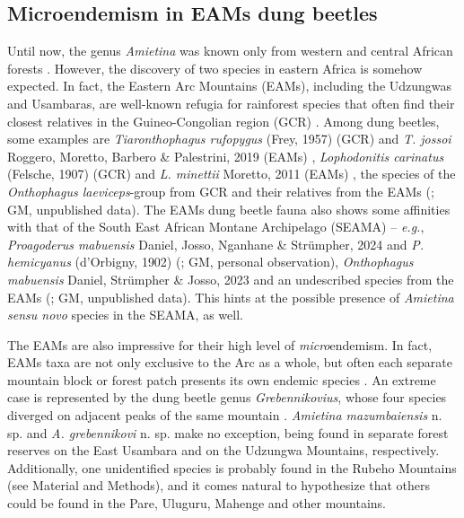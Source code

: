 \documentclass[fleqn,10pt,lineno]{wlpeerj}
\begin{document}
\subsection*{Microendemism in EAMs dung beetles} 
Until now, the genus \textit{Amietina} was known only from western and central African forests \citep{davis2008african}. However, the discovery of two species in eastern Africa is somehow expected. In fact, the Eastern Arc Mountains (EAMs), including the Udzungwas and Usambaras, are well-known refugia for rainforest species that often find their closest relatives in the Guineo-Congolian region (GCR) \citep{lovett2008biogeography, grebennikov2019miocene, grebennikov2021sky}. Among dung beetles, some examples are \textit{Tiaronthophagus rufopygus} (Frey, 1957) (GCR) and \textit{T. jossoi} Roggero, Moretto, Barbero \& Palestrini, 2019 (EAMs) \citep{roggero2019phylogenetic}, \textit{Lophodonitis carinatus} (Felsche, 1907) (GCR) and \textit{L. minettii} Moretto, 2011 (EAMs) \citep{moretto2011nouveaux}, the species of the \textit{Onthophagus laeviceps}-group from GCR and their relatives from the EAMs (\citealt{moretto2020nouveaux}; GM, unpublished data). The EAMs dung beetle fauna also shows some affinities with that of the South East African Montane Archipelago (SEAMA) \citep{bayliss2024biogeographical} -- \textit{e.g.}, \textit{Proagoderus mabuensis} Daniel, Josso, Nganhane \& Strümpher, 2024 and \textit{P. hemicyanus} (d'Orbigny, 1902) (\citealt{daniel2024dung}; GM, personal observation), \textit{Onthophagus mabuensis} Daniel, Strümpher \& Josso, 2023 and an undescribed species from the EAMs (\citealt{daniel2023dung}; GM, unpublished data).
This hints at the possible presence of \textit{Amietina sensu novo} species in the SEAMA, as well.

The EAMs are also impressive for their high level of \textit{micro}endemism. In fact, EAMs taxa are not only exclusive to the Arc as a whole, but often each separate mountain block or forest patch presents its own endemic species \citep{burgess2007biological}. An extreme case is represented by the dung beetle genus \textit{Grebennikovius}, whose four species diverged on adjacent peaks of the same mountain \citep{montanaro2024microallopatric}. \textit{Amietina mazumbaiensis} n. sp. and \textit{A. grebennikovi} n. sp. make no exception, being found in separate forest reserves on the East Usambara and on the Udzungwa Mountains, respectively. Additionally, one unidentified species is probably found in the Rubeho Mountains (see Material and Methods), and it comes natural to hypothesize that others could be found in the Pare, Uluguru, Mahenge and other mountains.
\end{document}
